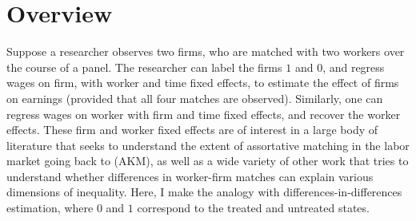 \documentclass{article}
\begin{document}
\setcounter{page}{0}

\newpage

\section{Overview}

Suppose a researcher observes two firms, who are matched with two workers over the course of a panel. The researcher can label the firms $1$ and $0$, and regress wages on firm, with worker and time fixed effects, to estimate the effect of firms on earnings (provided that all four matches are observed). Similarly, one can regress wages on worker with firm and time fixed effects, and recover the worker effects. These firm and worker fixed effects are of interest in a large body of literature that seeks to understand the extent of assortative matching in the labor market going back to \citet*{abowd1999high} (AKM), as well as a wide variety of other work that tries to understand whether differences in worker-firm matches can explain various dimensions of inequality. Here, I make the analogy with differences-in-differences estimation, where $0$ and $1$ correspond to the treated and untreated states.
\end{document}
